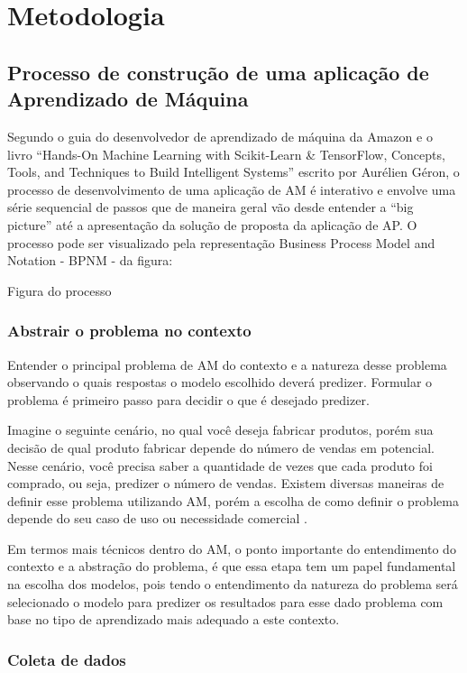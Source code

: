 \chapter{Metodologia}
\section{Processo de construção de uma aplicação de Aprendizado de Máquina}

Segundo o guia do desenvolvedor de aprendizado de máquina da Amazon e o livro “Hands-On Machine Learning with Scikit-Learn & TensorFlow, Concepts, Tools, and Techniques to Build Intelligent Systems” escrito por Aurélien Géron, o processo de desenvolvimento de uma aplicação de AM é interativo e envolve uma série sequencial de passos que de maneira geral vão desde entender a “big picture” até a apresentação da solução de proposta da aplicação de AP. O processo pode ser visualizado pela representação Business Process Model and Notation - BPNM - da figura:

Figura do processo

\subsection{Abstrair o problema no contexto}

Entender o principal problema de AM do contexto e a natureza desse problema observando o quais respostas o modelo escolhido deverá predizer. Formular o problema é primeiro passo para decidir o que é desejado predizer.

Imagine o seguinte cenário, no qual você deseja fabricar produtos, porém sua decisão de qual produto fabricar depende do número de vendas em potencial. Nesse cenário, você precisa saber a quantidade de vezes que cada produto foi comprado, ou seja, predizer o número de vendas. Existem diversas maneiras de definir esse problema utilizando AM, porém a escolha de como definir o problema depende do seu caso de uso ou necessidade comercial \cite{Amazon}.

Em termos mais técnicos dentro do AM, o ponto importante do entendimento do contexto e a abstração do problema, é que essa etapa tem um papel fundamental na escolha dos modelos, pois tendo o entendimento da natureza do problema será selecionado o modelo para predizer os resultados para esse dado problema com base no tipo de aprendizado mais adequado a este contexto.

\subsection{Coleta de dados}

